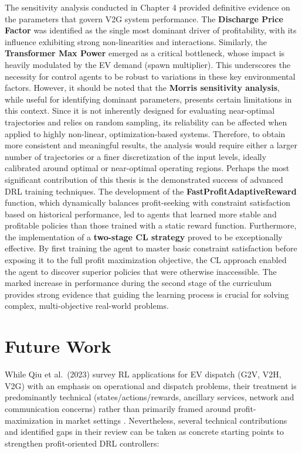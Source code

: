 \begin{itemize}
The sensitivity analysis conducted in Chapter 4 provided definitive evidence on the parameters that govern V2G system performance. The \textbf{Discharge Price Factor} was identified as the single most dominant driver of profitability, with its influence exhibiting strong non-linearities and interactions. Similarly, the \textbf{Transformer Max Power} emerged as a critical bottleneck, whose impact is heavily modulated by the EV demand (spawn multiplier). This underscores the necessity for control agents to be robust to variations in these key environmental factors.
\noindent
However, it should be noted that the \textbf{Morris sensitivity analysis}, while useful for identifying dominant parameters, presents certain limitations in this context. Since it is not inherently designed for evaluating near-optimal trajectories and relies on random sampling, its reliability can be affected when applied to highly non-linear, optimization-based systems. Therefore, to obtain more consistent and meaningful results, the analysis would require either a larger number of trajectories or a finer discretization of the input levels, ideally calibrated around optimal or near-optimal operating regions.
\noindent
Perhaps the most significant contribution of this thesis is the demonstrated success of advanced DRL training techniques. The development of the \textbf{FastProfitAdaptiveReward} function, which dynamically balances profit-seeking with constraint satisfaction based on historical performance, led to agents that learned more stable and profitable policies than those trained with a static reward function.
\noindent
Furthermore, the implementation of a \textbf{two-stage CL strategy} proved to be exceptionally effective. By first training the agent to master basic constraint satisfaction before exposing it to the full profit maximization objective, the CL approach enabled the agent to discover superior policies that were otherwise inaccessible. The marked increase in performance during the second stage of the curriculum provides strong evidence that guiding the learning process is crucial for solving complex, multi-objective real-world problems.


\section{Future Work}

\label{subsec:Qiu_bridge}

While Qiu et al.\ (2023) survey RL applications for EV dispatch (G2V, V2H, V2G) with an emphasis on operational and dispatch problems, their treatment is predominantly technical (states/actions/rewards, ancillary services, network and communication concerns) rather than primarily framed around profit-maximization in market settings \cite{Qiu2023}. Nevertheless, several technical contributions and identified gaps in their review can be taken as concrete starting points to strengthen profit-oriented DRL controllers:


\end{itemize}
